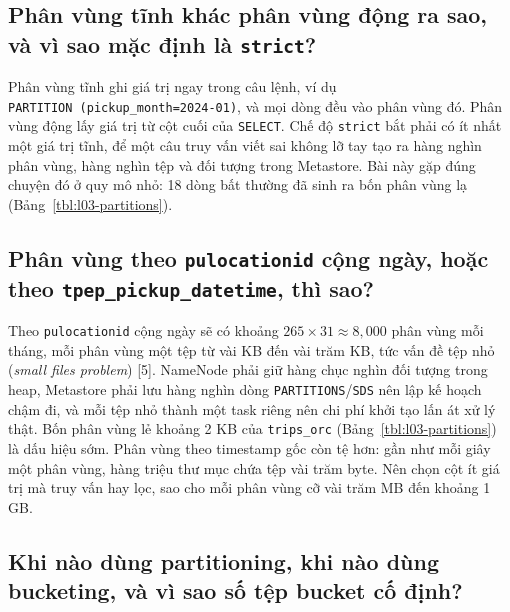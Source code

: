 \documentclass[
  12pt,
  a4paper,
]{article}
\begin{document}
\subsection{\texorpdfstring{Phân vùng tĩnh khác phân vùng động ra sao,
và vì sao mặc định là
\texttt{strict}?}{Phân vùng tĩnh khác phân vùng động ra sao, và vì sao mặc định là strict?}}\label{sec:l03-q5}

Phân vùng tĩnh ghi giá trị ngay trong câu lệnh, ví dụ
\texttt{PARTITION\ (pickup\_}\allowbreak{}\texttt{month=}\allowbreak{}\texttt{\textquotesingle{}2024-01\textquotesingle{})}\allowbreak{},
và mọi dòng đều vào phân vùng đó. Phân vùng động lấy giá trị từ cột cuối
của \texttt{SELECT}. Chế độ \texttt{strict} bắt phải có ít nhất một giá
trị tĩnh, để một câu truy vấn viết sai không lỡ tay tạo ra hàng nghìn
phân vùng, hàng nghìn tệp và đối tượng trong Metastore. Bài này gặp đúng
chuyện đó ở quy mô nhỏ: 18 dòng bất thường đã sinh ra bốn phân vùng lạ
(Bảng~\ref{tbl:l03-partitions}).

\subsection{\texorpdfstring{Phân vùng theo \texttt{pulocationid} cộng
ngày, hoặc theo
\texttt{tpep\_}\allowbreak{}\texttt{pickup\_}\allowbreak{}\texttt{datetime}\allowbreak{},
thì
sao?}{Phân vùng theo pulocationid cộng ngày, hoặc theo tpep\_pickup\_datetime, thì sao?}}\label{sec:l03-q6}

Theo \texttt{pulocationid} cộng ngày sẽ có khoảng
\(265 \times 31 \approx 8{,}000\) phân vùng mỗi tháng, mỗi phân vùng một
tệp từ vài KB đến vài trăm KB, tức vấn đề tệp nhỏ (\emph{small files
problem}) {[}5{]}. NameNode phải giữ hàng chục nghìn đối tượng trong
heap, Metastore phải lưu hàng nghìn dòng
\texttt{PARTITIONS}/\texttt{SDS} nên lập kế hoạch chậm đi, và mỗi tệp
nhỏ thành một task riêng nên chi phí khởi tạo lấn át xử lý thật. Bốn
phân vùng lẻ khoảng 2 KB của \texttt{trips\_orc}
(Bảng~\ref{tbl:l03-partitions}) là dấu hiệu sớm. Phân vùng theo
timestamp gốc còn tệ hơn: gần như mỗi giây một phân vùng, hàng triệu thư
mục chứa tệp vài trăm byte. Nên chọn cột ít giá trị mà truy vấn hay lọc,
sao cho mỗi phân vùng cỡ vài trăm MB đến khoảng 1 GB.

\subsection{Khi nào dùng partitioning, khi nào dùng bucketing, và vì sao
số tệp bucket cố định?}\label{sec:l03-q7}
\end{document}
